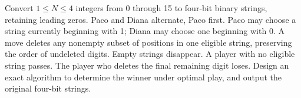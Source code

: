 Convert $1\le N\le4$ integers from 0 through 15 to four-bit binary strings, retaining leading zeros. Paco and Diana alternate, Paco first. Paco may choose a string currently beginning with 1; Diana may choose one beginning with 0. A move deletes any nonempty subset of positions in one eligible string, preserving the order of undeleted digits. Empty strings disappear. A player with no eligible string passes. The player who deletes the final remaining digit loses. Design an exact algorithm to determine the winner under optimal play, and output the original four-bit strings.
